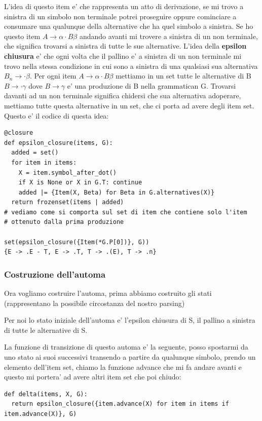 L'idea di questo item e' che rappresenta un atto di derivazione, se mi trovo a sinistra di un simbolo non terminale potrei proseguire oppure cominciare a consumare una qualunque della alternative che ha quel simbolo a sinistra. Se ho questo item $A \rightarrow \alpha \cdot B \beta$ andando avanti mi trovere a sinistra di un non terminale, che significa trovarsi a sinistra di tutte le sue alternative. L'idea della \textbf{epsilon chiusura} e' che ogni volta che il pallino e' a sinistra di un non terminale mi trovo nella stessa condizione in cui sono a sinistra di una qualsiasi sua alternativa $B_n \rightarrow \cdot \beta$. Per ogni item $A \rightarrow \alpha \cdot B \beta$ mettiamo in un set tutte le alternative di B $B \rightarrow \cdot \gamma$ dove $B \rightarrow \gamma$ e' una produzione di B nella grammatican G.
Trovarsi davanti ad un non terminale significa chidersi che sua alternativa adoperare, mettiamo tutte questa alternative in un set, che ci porta ad avere degli item set.
Questo e' il codice di questa idea:

\begin{lstlisting}
@closure
def epsilon_closure(items, G):
  added = set()
  for item in items:
    X = item.symbol_after_dot()
    if X is None or X in G.T: continue
    added |= {Item(X, Beta) for Beta in G.alternatives(X)}
  return frozenset(items | added)
# vediamo come si comporta sul set di item che contiene solo l'item
# ottenuto dalla prima produzione

set(epsilon_closure({Item(*G.P[0])}, G))
{E -> .E - T, E -> .T, T -> .(E), T -> .n}
\end{lstlisting}

\subsubsection{Costruzione dell'automa}
Ora vogliamo costruire l'automa, prima abbiamo costruito gli stati (rappresentano la possibile circostanza del nostro parsing)

Per noi lo stato iniziale dell'automa e' l'epsilon chiusura di S, il pallino a sinistra di tutte le alternative di S.

La funzione di transizione di questo automa e' la seguente, posso spostarmi da uno stato ai suoi successivi transendo a partire da qualunque simbolo, prendo un elemento dell'item set, chiamo la funzione advance che mi fa andare avanti e questo mi portera' ad avere altri item set che poi chiudo:
\begin{lstlisting}
def delta(items, X, G):
  return epsilon_closure({item.advance(X) for item in items if item.advance(X)}, G)
\end{lstlisting}


